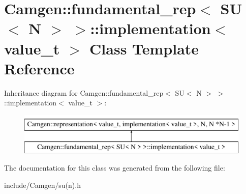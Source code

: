\hypertarget{a00285}{\section{Camgen\-:\-:fundamental\-\_\-rep$<$ S\-U$<$ N $>$ $>$\-:\-:implementation$<$ value\-\_\-t $>$ Class Template Reference}
\label{a00285}
}
Inheritance diagram for Camgen\-:\-:fundamental\-\_\-rep$<$ S\-U$<$ N $>$ $>$\-:\-:implementation$<$ value\-\_\-t $>$\-:\begin{figure}[H]
\begin{center}
\leavevmode
\includegraphics[height=2.000000cm]{a00285}
\end{center}
\end{figure}


The documentation for this class was generated from the following file\-:\begin{DoxyCompactItemize}
\item 
include/\-Camgen/su(n).\-h\end{DoxyCompactItemize}
